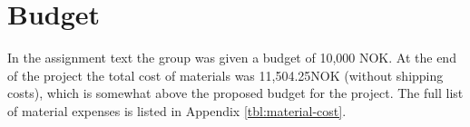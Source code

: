 \section{Budget}
 
In the assignment text the group was given a budget of 10,000 NOK.
At the end of the project the total cost of materials was 11,504.25NOK (without shipping costs), which is somewhat above the proposed budget for the project.
The full list of material expenses is listed in Appendix \ref{tbl:material-cost}.